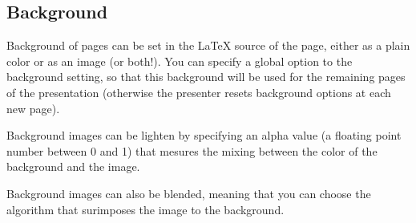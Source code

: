 \documentclass[12pt]{article}
\begin{document}
\subsection{Background}

Background of pages can be set in the {\LaTeX} source of the page,
either as a plain color or as an image (or both!).
You can specify a global option to the background setting, so that this
background will be used for the remaining pages of the presentation
(otherwise the presenter resets background options at each new page).

Background images can be lighten by specifying an alpha value (a
floating point number between 0 and 1) that mesures the mixing
between the color of the background and the image.

Background images can also be blended, meaning that you can choose the
algorithm that surimposes the image to the background.
\end{document}
